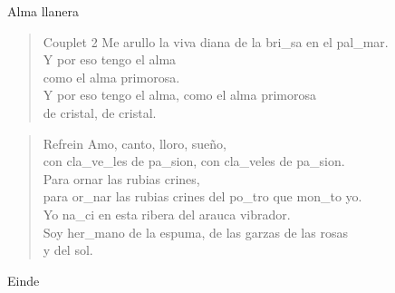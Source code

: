 \begin{song}[joropo]{Alma llanera}
\begin{verse}{Couplet 2}
Me arullo la viva diana de la bri\_sa en el   pal\_mar.  \hspace{1em} \hspace{1em}  \hspace{1em}\\
  Y por eso tengo el alma  \hspace{1em} \hspace{1em}  \hspace{1em}\\
  como el alma primorosa.  \hspace{1em} \hspace{1em}  \hspace{1em}\\
  Y por eso tengo el alma, como el alma primorosa\\
de cristal, de cristal.  \\
\end{verse}

\begin{verse}{Refrein}
Amo, canto, lloro, sueño,\chord{}\\
con cla\_ve\_les de pa\_sion, con cla\_veles de pa\_sion.\\
Para ornar las rubias crines,\\
para or\_nar las rubias crines del po\_tro que mon\_to yo.\\
Yo na\_ci en esta ribera del arauca vibrador.\\
Soy her\_mano de la espuma, de las garzas de las rosas   \\
y del sol.
\end{verse}

\begin{instrumental}{Einde}
            
\end{instrumental}
\end{song}

